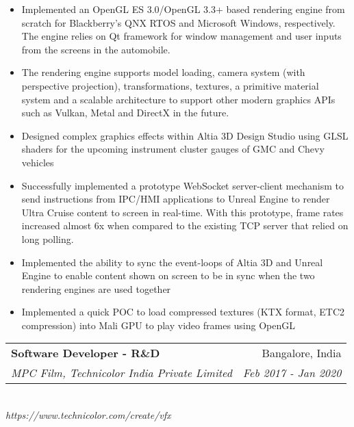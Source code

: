 \documentclass[a4paper,11pt]{article}
\makeatletter
\newcommand{\resumeSubheading}[4]{
  \vspace{-1pt}\item
    \begin{tabular*}{0.97\textwidth}[t]{l@{\extracolsep{\fill}}r}
      \textbf{#1} & #2 \\
      \textit{\small#3} & \textit{\small #4} \\
    \end{tabular*}
    \vspace{-5pt}
}
\newcommand{\resumeItemListStart}{
  \begin{itemize}
}
\newcommand{\resumeItemListEnd}{
  \end{itemize}
  \vspace{-5pt}
}
\makeatother
\begin{document}
        \resumeItemListStart
          \item\small{{Implemented an OpenGL ES 3.0/OpenGL 3.3+ based rendering engine from scratch for Blackberry's QNX RTOS and Microsoft Windows, respectively. The engine relies on Qt framework for window management and user inputs from the screens in the automobile.}}
          \item\small{{The rendering engine supports model loading, camera system (with perspective projection), transformations, textures, a primitive material system and a scalable architecture to support other modern graphics APIs such as Vulkan, Metal and DirectX in the future.}}
          \item\small{{Designed complex graphics effects within Altia 3D Design Studio using GLSL shaders for the upcoming instrument cluster gauges of GMC and Chevy vehicles}}
          \item\small{{Successfully implemented a prototype WebSocket server-client mechanism to send instructions from IPC/HMI applications to Unreal Engine to render Ultra Cruise content to screen in real-time. With this prototype, frame rates increased almost 6x when compared to the existing TCP server that relied on long polling.}}
          \item\small{{Implemented the ability to sync the event-loops of Altia 3D and Unreal Engine to enable content shown on screen to be in sync when the two rendering engines are used together}}
          \item\small{{Implemented a quick POC to load compressed textures (KTX format, ETC2 compression) into Mali GPU to play video frames using OpenGL}}
        \resumeItemListEnd

      \resumeSubheading
        {Software Developer - R\&D}
        {Bangalore, India}
        {MPC Film, Technicolor India Private Limited}
        {Feb 2017 - Jan 2020} \\
        \vspace{3pt}
        \textit{\small{https://www.technicolor.com/create/vfx}}
\end{document}
